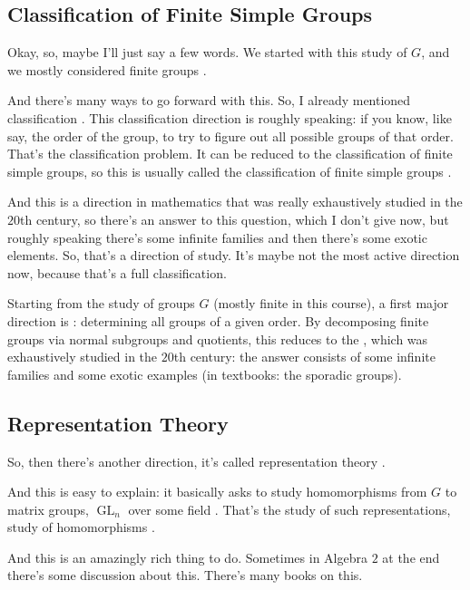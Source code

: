 \subsection{Classification of Finite Simple Groups}

\begin{speech}[00:33:51 - 00:35:02]
Okay, so, maybe I'll just say a few words. We started with this study of $G$, and we mostly considered finite groups .

And there's many ways to go forward with this. So, I already mentioned classification . This classification direction is roughly speaking: if you know, like say, the order of the group, to try to figure out all possible groups of that order. That's the classification problem. It can be reduced to the classification of finite simple groups, so this is usually called the classification of finite simple groups .

And this is a direction in mathematics that was really exhaustively studied in the $20$th century, so there's an answer to this question, which I don't give now, but roughly speaking there's some infinite families and then there's some exotic elements. So, that's a direction of study. It's maybe not the most active direction now, because that's a full classification.
\end{speech}

\begin{content}
Starting from the study of groups $G$ (mostly finite in this course), a first major direction is : determining all groups of a given order. By decomposing finite groups via normal subgroups and quotients, this reduces to the , which was exhaustively studied in the $20$th century: the answer consists of some infinite families and some exotic examples (in textbooks: the sporadic groups).
\end{content}

\subsection{Representation Theory}

\begin{speech}[00:35:02 - 00:35:43]
So, then there's another direction, it's called representation theory .

And this is easy to explain: it basically asks to study homomorphisms from $G$ to matrix groups, $\operatorname{GL}_n$ over some field . That's the study of such representations, study of homomorphisms .

And this is an amazingly rich thing to do. Sometimes in Algebra $2$ at the end there's some discussion about this. There's many books on this.
\end{speech}

